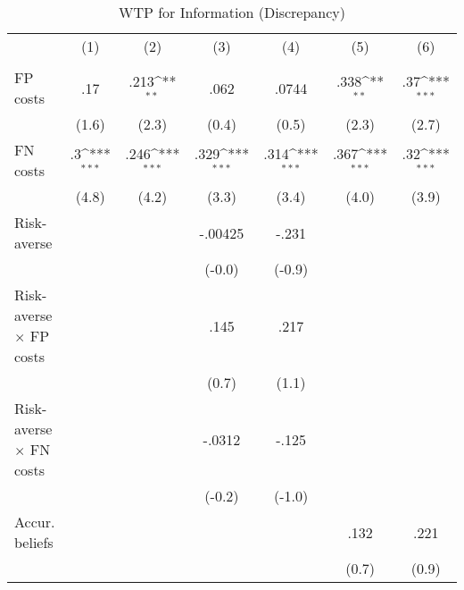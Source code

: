 \begin{table}[htbp]\centering
\def\sym#1{\ifmmode^{#1}\else\(^{#1}\)\fi}
\caption{WTP for Information (Discrepancy)}
\begin{tabular}{l*{6}{c}}
\hline\hline
                &\multicolumn{1}{c}{(1)}&\multicolumn{1}{c}{(2)}&\multicolumn{1}{c}{(3)}&\multicolumn{1}{c}{(4)}&\multicolumn{1}{c}{(5)}&\multicolumn{1}{c}{(6)}\\
                &\multicolumn{1}{c}{}&\multicolumn{1}{c}{}&\multicolumn{1}{c}{}&\multicolumn{1}{c}{}&\multicolumn{1}{c}{}&\multicolumn{1}{c}{}\\
\hline
FP costs        &      .17         &     .213\sym{**} &     .062         &    .0744         &     .338\sym{**} &      .37\sym{***}\\
                &    (1.6)         &    (2.3)         &    (0.4)         &    (0.5)         &    (2.3)         &    (2.7)         \\
FN costs        &       .3\sym{***}&     .246\sym{***}&     .329\sym{***}&     .314\sym{***}&     .367\sym{***}&      .32\sym{***}\\
                &    (4.8)         &    (4.2)         &    (3.3)         &    (3.4)         &    (4.0)         &    (3.9)         \\
Risk-averse     &                  &                  &  -.00425         &    -.231         &                  &                  \\
                &                  &                  &   (-0.0)         &   (-0.9)         &                  &                  \\
Risk-averse $\times$ FP costs&                  &                  &     .145         &     .217         &                  &                  \\
                &                  &                  &    (0.7)         &    (1.1)         &                  &                  \\
Risk-averse $\times$ FN costs&                  &                  &   -.0312         &    -.125         &                  &                  \\
                &                  &                  &   (-0.2)         &   (-1.0)         &                  &                  \\
Accur. beliefs  &                  &                  &                  &                  &     .132         &     .221         \\
                &                  &                  &                  &                  &    (0.7)         &    (0.9)         \\

\end{tabular}
\end{table}
